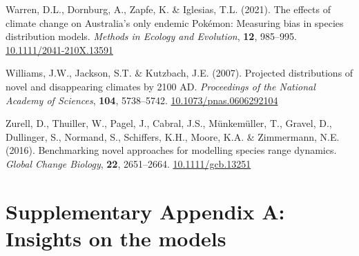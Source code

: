 \documentclass[11pt,]{article}
\newlength{\cslhangindent}
\newenvironment{CSLReferences}[2] %
 {%
  \setlength{\parindent}{0pt}
  \ifodd #1 \everypar{\setlength{\hangindent}{\cslhangindent}}\ignorespaces\fi
  \ifnum #2 > 0
  \setlength{\parskip}{#2\baselineskip}
  \fi
 }%
 {}
\begin{document}
\begin{CSLReferences}{1}{0}
\leavevmode{}%
Warren, D.L., Dornburg, A., Zapfe, K. \& Iglesias, T.L. (2021). The
effects of climate change on {Australia}'s only endemic {Pokémon}:
{Measuring} bias in species distribution models. \emph{Methods in
Ecology and Evolution}, \textbf{12}, 985--995.
\href{https://doi.org/10.1111/2041-210X.13591}{10.1111/2041-210X.13591}

\leavevmode{}%
Williams, J.W., Jackson, S.T. \& Kutzbach, J.E. (2007). Projected
distributions of novel and disappearing climates by 2100 {AD}.
\emph{Proceedings of the National Academy of Sciences}, \textbf{104},
5738--5742.
\href{https://doi.org/10.1073/pnas.0606292104}{10.1073/pnas.0606292104}

\leavevmode{}%
Zurell, D., Thuiller, W., Pagel, J., Cabral, J.S., Münkemüller, T.,
Gravel, D., Dullinger, S., Normand, S., Schiffers, K.H., Moore, K.A. \&
Zimmermann, N.E. (2016). Benchmarking novel approaches for modelling
species range dynamics. \emph{Global Change Biology}, \textbf{22},
2651--2664. \href{https://doi.org/10.1111/gcb.13251}{10.1111/gcb.13251}

\end{CSLReferences}

\newpage

\hypertarget{appendixA}{%
\section{Supplementary Appendix A: Insights on the
models}\label{appendixA}}

\renewcommand*\thetable{A.\arabic{table}}
\renewcommand*\thefigure{A.\arabic{figure}}

\setcounter{figure}{0}
\setcounter{table}{0}

\renewcommand*{\thepage}{A--\arabic{page}}
\end{document}
